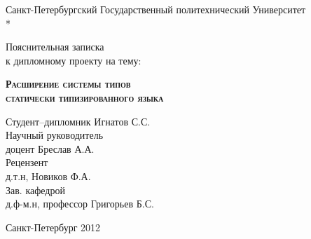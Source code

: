 \begin{titlepage}
\newpage

\begin{center}
Санкт-Петербургский Государственный политехнический Университет \\*
\hrulefill
\end{center}


\vspace{8em}

\begin{center}
\Large Пояснительная записка \\ к дипломному проекту на тему:
\end{center}

\vspace{2.5em}

\begin{center}
\textsc{\textbf{Расширение системы типов \\ статически типизированного языка}}
\end{center}

\vspace{6em}

\begin{flushleft}
Студент--дипломник \hrulefill Игнатов С.С. \\
\vspace{1.5em}
Научный руководитель \\
доцент \hrulefill Бреслав А.А.\\
\vspace{1.5em}
Рецензент \\
д.т.н, \hrulefill Новиков Ф.А.\\
\vspace{1.5em}
Зав. кафедрой  \\
д.ф-м.н, профессор \hrulefill Григорьев Б.С.
\end{flushleft}

\vspace{\fill}

\begin{center}
Санкт-Петербург 2012
\end{center}

\end{titlepage}